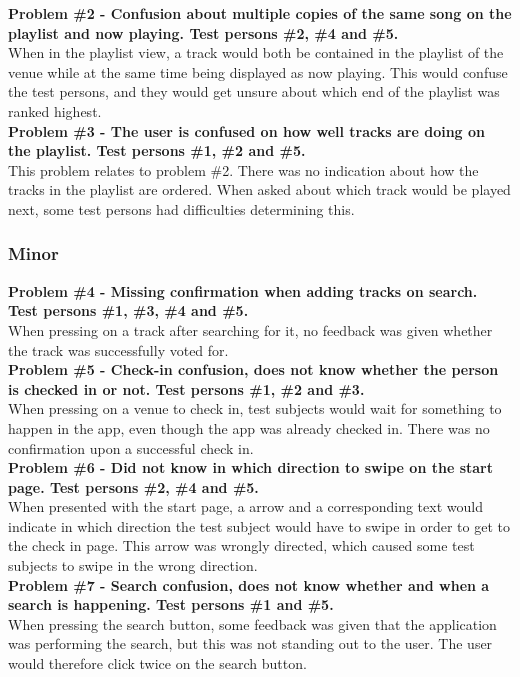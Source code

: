 \noindent\textbf{Problem \#2 - Confusion about multiple copies of the same song on the playlist
    and now playing. Test persons \#2, \#4 and \#5.}\\
  When in the playlist view, a track would both be contained in the
  playlist of the venue while at the same time being displayed as now
  playing. This would confuse the test persons, and they would get
  unsure about which end of the playlist was ranked highest.\\

\noindent\textbf{Problem \#3 - The user is confused on how well tracks are doing on the
    playlist. Test persons \#1, \#2 and \#5.}\\
  This problem relates to problem \#2. There was no indication about
  how the tracks in the playlist are ordered. When asked about which
  track would be played next, some test persons had difficulties
  determining this.\\

\subsubsection{Minor}
\textbf{Problem \#4 - Missing confirmation when adding tracks on search. Test persons
    \#1, \#3, \#4 and \#5.}\\
  When pressing on a track after searching for it, no feedback was
  given whether the track was successfully voted for.\\

\noindent\textbf{Problem \#5 - Check-in confusion, does not know whether the person is checked
    in or not. Test persons \#1, \#2 and \#3.}\\
  When pressing on a venue to check in, test subjects would wait for
  something to happen in the app, even though the app was already
  checked in. There was no confirmation upon a successful check in.\\

\noindent\textbf{Problem \#6 - Did not know in which direction to swipe on the start page. Test
    persons \#2, \#4 and \#5.}\\
  When presented with the start page, a arrow and a corresponding text
  would indicate in which direction the test subject would have to
  swipe in order to get to the check in page. This arrow was wrongly
  directed, which caused some test subjects to swipe in the wrong direction.\\

\noindent\textbf{Problem \#7 - Search confusion, does not know whether and when a search is
    happening. Test persons \#1 and \#5.}\\
  When pressing the search button, some feedback was given that the
  application was performing the search, but this was not standing out
  to the user. The user would therefore click twice on the search button.\\

